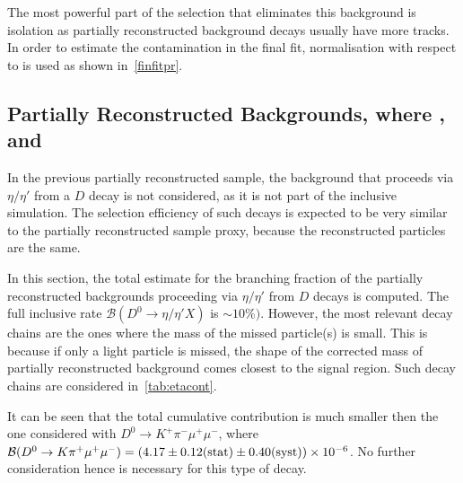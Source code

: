 The most powerful part of the selection that eliminates this background is isolation as partially reconstructed background decays usually have more tracks. In order to estimate the contamination in the final fit, normalisation with respect to \bjpsimumuk is used as shown in~\autoref{finfitpr}.

\subsection{Partially Reconstructed Backgrounds, where , and }
\label{etasec}
In the previous partially reconstructed sample, the background that proceeds via $\eta/\eta'$ from a $D$ decay is not considered, as it is not part of the inclusive simulation. The selection efficiency of such decays is expected to be very similar to the partially reconstructed sample proxy, because the reconstructed particles are the same.

In this section, the total estimate for the branching fraction of the partially reconstructed backgrounds proceeding via $\eta/\eta'$ from $D$ decays is computed. The full inclusive rate $\mathcal{B} (D^{0} \rightarrow \eta / \eta' X)$ is $ \sim 10 \%)$. However, the most relevant decay chains are the ones where the mass of the missed particle(s) is small. This is because if only a light particle is missed, the shape of the corrected mass of partially reconstructed background comes closest to the signal region. Such decay chains are considered in~\autoref{tab:etacont}.

It can be seen that the total cumulative contribution is much smaller then the one considered with $D^{0}\rightarrow K^{+} \pi^{-} \mu^{+} \mu^{-}$, where $\mathcal{B}(D^0 \rightarrow K \pi^+ \mu^{+} \mu^{-}) = (4.17\pm0.12 \rm{(stat)}\pm 0.40 \rm{(syst)})\times 10^{-6}$\cite{Aaij:2015hva}. No further consideration hence is necessary for this type of decay.

